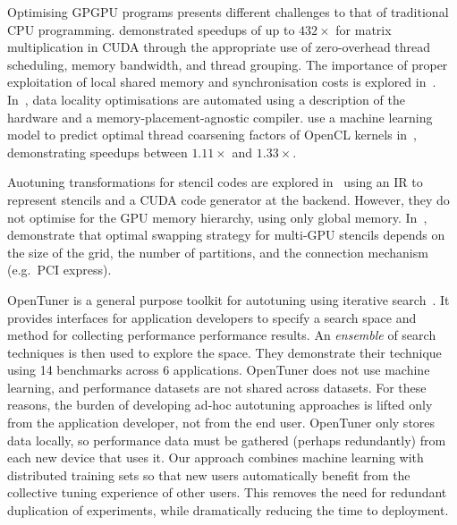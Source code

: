 \documentclass[nonatbib,preprint,9pt]{sigplanconf}
\begin{document}
Optimising GPGPU programs presents different challenges to that of
traditional CPU programming. \citeauthor{Ryoo2008a} demonstrated
speedups of up to $432\times$ for matrix multiplication in CUDA
through the appropriate use of zero-overhead thread scheduling, memory
bandwidth, and thread grouping. The importance of proper exploitation
of local shared memory and synchronisation costs is explored
in~\cite{Lee2010}. In~\cite{Chen2014}, data locality optimisations are
automated using a description of the hardware and a
memory-placement-agnostic compiler. \citeauthor{Magni2014} use a
machine learning model to predict optimal thread coarsening factors of
OpenCL kernels in~\cite{Magni2014}, demonstrating speedups between
$1.11\times$ and $1.33\times$.

Auotuning transformations for stencil codes are explored
in~\cite{Kamil2010} using an IR to represent stencils and a CUDA code
generator at the backend. However, they do not optimise for the GPU
memory hierarchy, using only global memory. In~\cite{Lutz2013},
\citeauthor{Lutz2013} demonstrate that optimal swapping strategy for
multi-GPU stencils depends on the size of the grid, the number of
partitions, and the connection mechanism (e.g.\ PCI express).

OpenTuner is a general purpose toolkit for autotuning using iterative
search~\cite{Ansel2013}. It provides interfaces for application
developers to specify a search space and method for collecting
performance performance results. An \emph{ensemble} of search
techniques is then used to explore the space. They demonstrate their
technique using 14 benchmarks across 6 applications. OpenTuner does
not use machine learning, and performance datasets are not shared
across datasets. For these reasons, the burden of developing ad-hoc
autotuning approaches is lifted only from the application developer,
not from the end user. OpenTuner only stores data locally, so
performance data must be gathered (perhaps redundantly) from each new
device that uses it.  Our approach combines machine learning with
distributed training sets so that new users automatically benefit from
the collective tuning experience of other users. This removes the need
for redundant duplication of experiments, while dramatically reducing
the time to deployment.
\end{document}
